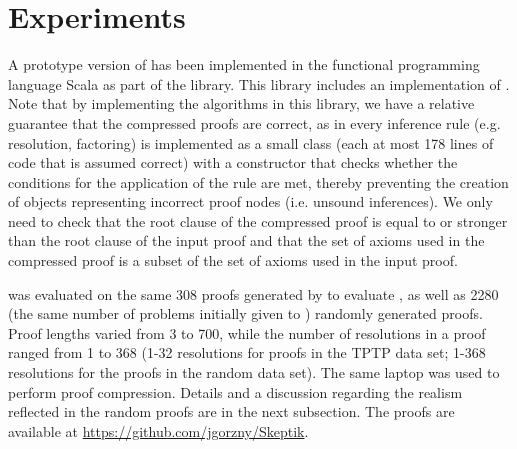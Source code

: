 \section{Experiments} \label{sec:exp}

A prototype version of {\FORPI} has been implemented in the functional programming language Scala as part of the \skeptik
library. This library includes an implementation of {\GFOLU} \cite{GFOLU}. 
Note that by implementing the algorithms in this library, we have a relative guarantee that the compressed proofs are correct, as in \skeptik every inference rule (e.g. resolution, factoring) is implemented as a small class (each at most 178 lines of code that is assumed correct) with a constructor that checks whether the conditions for the application of the rule are met, thereby preventing the creation of objects representing incorrect proof nodes (i.e. unsound inferences). We only need to check that the root clause of the compressed proof is equal to or stronger than the root clause of the input proof and that the set of axioms used in the compressed proof is a subset of the set of axioms used in the input proof.



{\FORPI} was evaluated on the same 308 proofs generated by {\SPASS} to evaluate {\GFOLU}, as well as 2280 (the same number of problems initially given to {\SPASS}) randomly generated proofs. Proof lengths varied from 3 to 700, while the number of resolutions in a proof ranged from 1 to 368 (1-32 resolutions for proofs in the TPTP data set; 1-368 resolutions for the proofs in the random data set). The same laptop was used to perform proof compression. Details and a discussion regarding the realism reflected in the random proofs are in the next subsection.
The proofs are available at \url{https://github.com/jgorzny/Skeptik}.

